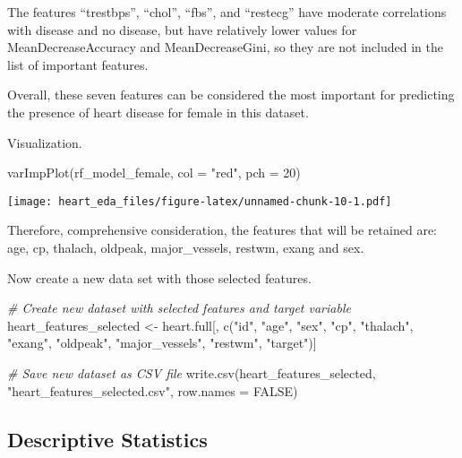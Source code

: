 \documentclass[
]{article}
\newenvironment{Shaded}{\begin{snugshade}}{\end{snugshade}}
\newcommand{\AttributeTok}[1]{\textcolor[rgb]{0.77,0.63,0.00}{#1}}
\newcommand{\CommentTok}[1]{\textcolor[rgb]{0.56,0.35,0.01}{\textit{#1}}}
\newcommand{\ConstantTok}[1]{\textcolor[rgb]{0.00,0.00,0.00}{#1}}
\newcommand{\DecValTok}[1]{\textcolor[rgb]{0.00,0.00,0.81}{#1}}
\newcommand{\FunctionTok}[1]{\textcolor[rgb]{0.00,0.00,0.00}{#1}}
\newcommand{\NormalTok}[1]{#1}
\newcommand{\OtherTok}[1]{\textcolor[rgb]{0.56,0.35,0.01}{#1}}
\newcommand{\StringTok}[1]{\textcolor[rgb]{0.31,0.60,0.02}{#1}}
\begin{document}
The features ``trestbps'', ``chol'', ``fbs'', and ``restecg'' have
moderate correlations with disease and no disease, but have relatively
lower values for MeanDecreaseAccuracy and MeanDecreaseGini, so they are
not included in the list of important features.

Overall, these seven features can be considered the most important for
predicting the presence of heart disease for female in this dataset.

Visualization.

\begin{Shaded}
\begin{Highlighting}[]
\FunctionTok{varImpPlot}\NormalTok{(rf\_model\_female, }\AttributeTok{col =} \StringTok{"red"}\NormalTok{, }\AttributeTok{pch =} \DecValTok{20}\NormalTok{)}
\end{Highlighting}
\end{Shaded}

\texttt{[image: heart\_eda\_files/figure-latex/unnamed-chunk-10-1.pdf]}

Therefore, comprehensive consideration, the features that will be
retained are: age, cp, thalach, oldpeak, major\_vessels, restwm, exang
and sex.

Now create a new data set with those selected features.

\begin{Shaded}
\begin{Highlighting}[]
\CommentTok{\# Create new dataset with selected features and target variable}
\NormalTok{heart\_features\_selected }\OtherTok{\textless{}{-}}\NormalTok{ heart.full[, }\FunctionTok{c}\NormalTok{(}\StringTok{"id"}\NormalTok{, }\StringTok{"age"}\NormalTok{, }\StringTok{"sex"}\NormalTok{, }\StringTok{"cp"}\NormalTok{, }\StringTok{"thalach"}\NormalTok{, }\StringTok{"exang"}\NormalTok{, }\StringTok{"oldpeak"}\NormalTok{, }\StringTok{"major\_vessels"}\NormalTok{, }\StringTok{"restwm"}\NormalTok{, }\StringTok{"target"}\NormalTok{)]}

\CommentTok{\# Save new dataset as CSV file}
\FunctionTok{write.csv}\NormalTok{(heart\_features\_selected, }\StringTok{"heart\_features\_selected.csv"}\NormalTok{, }\AttributeTok{row.names =} \ConstantTok{FALSE}\NormalTok{)}
\end{Highlighting}
\end{Shaded}

\hypertarget{descriptive-statistics}{%
\subsection{Descriptive Statistics}\label{descriptive-statistics}}
\end{document}

